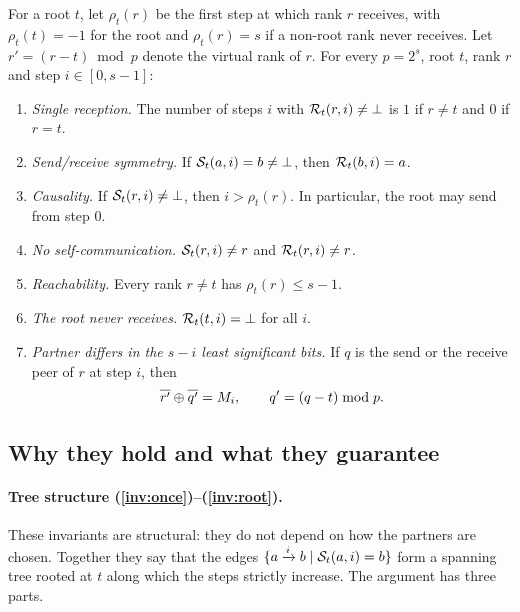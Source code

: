 For a root $t$, let $\rho_t(r)$ be the first step at which rank $r$ receives, with $\rho_t(t)=-1$ for the root and $\rho_t(r)=s$ if a non-root rank never receives.
Let $r'=(r-t)\bmod p$ denote the virtual rank of $r$.
For every $p=2^s$, root $t$, rank $r$ and step $i\in[0,s-1]$:
\begingroup
\renewcommand{\theenumi}{I\arabic{enumi}}
\renewcommand{\labelenumi}{\textbf{(\theenumi)}}
\begin{enumerate}
  \item \label{inv:once} \emph{Single reception.} The number of steps $i$ with $\mathcal{R}_t(r,i)\neq\bot$ is $1$ if $r\neq t$ and $0$ if $r=t$.
  \item \label{inv:sym} \emph{Send/receive symmetry.} If $\mathcal{S}_t(a,i)=b\neq\bot$, then $\mathcal{R}_t(b,i)=a$.
  \item \label{inv:causal} \emph{Causality.} If $\mathcal{S}_t(r,i)\neq\bot$, then $i>\rho_t(r)$. In particular, the root may send from step $0$.
  \item \label{inv:self} \emph{No self-communication.} $\mathcal{S}_t(r,i)\neq r$ and $\mathcal{R}_t(r,i)\neq r$.
  \item \label{inv:reach} \emph{Reachability.} Every rank $r\neq t$ has $\rho_t(r)\le s-1$.
  \item \label{inv:root} \emph{The root never receives.} $\mathcal{R}_t(t,i)=\bot$ for all $i$.
  \item \label{inv:xor} \emph{Partner differs in the $s-i$ least significant bits.} If $q$ is the send or the receive peer of $r$ at step $i$, then
  \begin{equation}
    \overline{r'}\oplus\overline{q'}=M_i,\qquad q'=(q-t)\bmod p .
    \label{eq:inv-xor}
  \end{equation}
\end{enumerate}
\endgroup

\subsection{Why they hold and what they guarantee}

\paragraph{Tree structure (\ref{inv:once})--(\ref{inv:root}).}
These invariants are structural: they do not depend on how the partners are chosen.
Together they say that the edges $\{a\xrightarrow{i}b \mid \mathcal{S}_t(a,i)=b\}$ form a spanning tree rooted at $t$ along which the steps strictly increase.
The argument has three parts.

